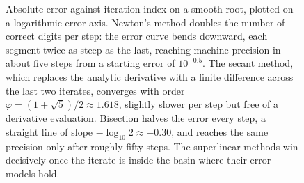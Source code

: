 \begin{figure}[ht]
\begin{tikzpicture}[x=1cm, y=1cm, font=\small]
\end{tikzpicture}
\caption[Convergence rates of Newton, secant, and bisection]{Absolute
error against iteration index on a smooth root, plotted on a
logarithmic error axis. Newton's method doubles the number of correct
digits per step: the error curve bends downward, each segment twice as
steep as the last, reaching machine precision in about five steps from
a starting error of $10^{-0.5}$. The secant method, which replaces the
analytic derivative with a finite difference across the last two
iterates, converges with order $\varphi = (1 + \sqrt{5})/2 \approx
1.618$, slightly slower per step but free of a derivative evaluation.
Bisection halves the error every step, a straight line of slope
$-\log_{10} 2 \approx -0.30$, and reaches the same precision only after
roughly fifty steps. The superlinear methods win decisively once the
iterate is inside the basin where their error models hold.}
\label{fig:vol02:ch05:secant-convergence}
\end{figure}
